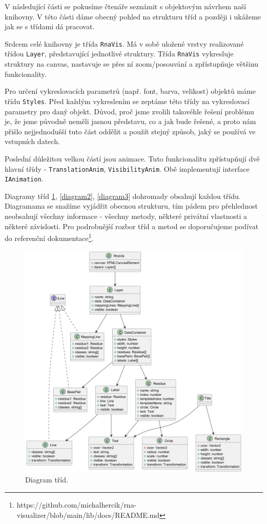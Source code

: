 V následující části se pokusíme čtenáře seznámit s objektovým návrhem naší
knihovny. V této části dáme obecný pohled na strukturu tříd a později i ukážeme
jak se s třídami dá pracovat.

Srdcem celé knihovny je třída \texttt{RnaVis}. Má v sobě uložené vrstvy
realizované třídou \texttt{Layer}, představující jednotlivé struktury. Třída
\texttt{RnaVis} vykresluje struktury na canvas, nastavuje se přes ní
zoom/posouvání a zpřístupňuje většinu funkcionality.

Pro určení vykreslovacích parametrů (např. font, barva, velikost) objektů  máme
třídu \texttt{Styles}. Před každým vykreslením se zeptáme této třídy na
vykreslovací parametry pro daný objekt. Důvod, proč jsme zvolili takovéhle
řešení problému je, že jsme původně neměli jasnou představu, co a jak bude
řešené, a proto nám přišlo nejjednodušší tuto část oddělit a použít stejný
způsob, jaký se používá ve vstupních datech.

Poslední důležitou velkou částí jsou animace. Tuto funkcionalitu zpřístupňují
dvě hlavní třídy - \texttt{TranslationAnim}, \texttt{VisibilityAnim}. Obě
implementují interface \texttt{IAnimation}. 

\sloppy

Diagramy tříd \ref{diagram1}, \ref{diagram2}, \ref{diagram3} dohromady obsahují
každou třídu. Diagramama se snažíme vyjádřit obecnou strukturu, tím pádem pro
přehlednost neobsahují všechny informace - všechny metody, některé privátní
vlastnosti a některé závislosti. Pro podrobnější rozbor tříd a metod se
doporučujeme podívat do referenční
dokumentace\footnote{https://github.com/michalhercik/rna-visualizer/blob/main/lib/docs/README.md}.

\fussy
 
\begin{figure}[H]
  \centering
  \includegraphics[width=145mm]{../img/kap03/rnavis.png}
  \caption[Diagram tříd]{Diagram tříd.}
  \label{diagram1}
\end{figure}


